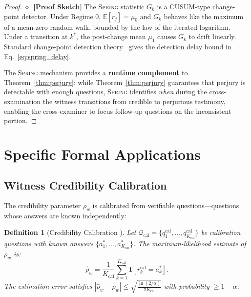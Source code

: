 \documentclass[11pt,a4paper]{article}
\newtheorem{definition}[theorem]{Definition}
\theoremstyle{definition}
\newcommand{\rigorSketch}[0]{$\diamond$~\textbf{[Proof Sketch]}}
\newcommand{\Spring}{\textsc{Spring}}
\newcommand{\E}{\mathbb{E}}
\newcommand{\ind}[1]{\mathbf{1}[#1]}
\newcommand{\abs}[1]{\left|#1\right|}
\begin{document}
\begin{proof} \rigorSketch
The \Spring{} statistic $G_k$ is a CUSUM-type change-point detector. Under Regime 0, $\E[r_j] = \mu_0$ and $G_k$ behaves like the maximum of a mean-zero random walk, bounded by the law of the iterated logarithm. Under a transition at $k^*$, the post-change mean $\mu_1$ causes $G_k$ to drift linearly. Standard change-point detection theory~\cite{Page1954, Basseville1993} gives the detection delay bound in Eq.~\eqref{eq:spring_delay}.

The \Spring{} mechanism provides a \textbf{runtime complement} to Theorem~\ref{thm:perjury}: while Theorem~\ref{thm:perjury} guarantees that perjury is detectable with enough questions, \Spring{} identifies \textit{when} during the cross-examination the witness transitions from credible to perjurious testimony, enabling the cross-examiner to focus follow-up questions on the inconsistent portion.
\end{proof}

\section{Specific Formal Applications }
\label{sec:applications}

\subsection{Witness Credibility Calibration }

The credibility parameter $\rho_w$ is calibrated from verifiable questions---questions whose answers are known independently:

\begin{definition}[Credibility Calibration ]
\label{def:calibration}
Let $\mathcal{Q}_{\mathrm{cal}} = \{q_1^{\mathrm{cal}}, \ldots, q_{K_{\mathrm{cal}}}^{\mathrm{cal}}\}$ be calibration questions with known answers $\{a_1^*, \ldots, a_{K_{\mathrm{cal}}}^*\}$. The maximum-likelihood estimate of $\rho_w$ is:
\begin{equation}
    \hat{\rho}_w = \frac{1}{K_{\mathrm{cal}}} \sum_{k=1}^{K_{\mathrm{cal}}} \ind{r_k^{\mathrm{cal}} = a_k^*}.
    \label{eq:rho_hat}
\end{equation}
The estimation error satisfies $\abs{\hat{\rho}_w - \rho_w} \leq \sqrt{\frac{\ln(2/\alpha)}{2 K_{\mathrm{cal}}}}$ with probability $\geq 1 - \alpha$.
\end{definition}
\end{document}
